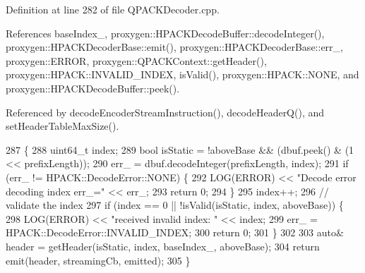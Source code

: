 Definition at line 282 of file Q\+P\+A\+C\+K\+Decoder.\+cpp.



References base\+Index\+\_\+, proxygen\+::\+H\+P\+A\+C\+K\+Decode\+Buffer\+::decode\+Integer(), proxygen\+::\+H\+P\+A\+C\+K\+Decoder\+Base\+::emit(), proxygen\+::\+H\+P\+A\+C\+K\+Decoder\+Base\+::err\+\_\+, proxygen\+::\+E\+R\+R\+OR, proxygen\+::\+Q\+P\+A\+C\+K\+Context\+::get\+Header(), proxygen\+::\+H\+P\+A\+C\+K\+::\+I\+N\+V\+A\+L\+I\+D\+\_\+\+I\+N\+D\+EX, is\+Valid(), proxygen\+::\+H\+P\+A\+C\+K\+::\+N\+O\+NE, and proxygen\+::\+H\+P\+A\+C\+K\+Decode\+Buffer\+::peek().



Referenced by decode\+Encoder\+Stream\+Instruction(), decode\+Header\+Q(), and set\+Header\+Table\+Max\+Size().


\begin{DoxyCode}
287                         \{
288   uint64\_t index;
289   \textcolor{keywordtype}{bool} isStatic = !aboveBase && (dbuf.peek() & (1 << prefixLength));
290   err_ = dbuf.decodeInteger(prefixLength, index);
291   \textcolor{keywordflow}{if} (err_ != HPACK::DecodeError::NONE) \{
292     LOG(ERROR) << \textcolor{stringliteral}{"Decode error decoding index err\_="} << err_;
293     \textcolor{keywordflow}{return} 0;
294   \}
295   index++;
296   \textcolor{comment}{// validate the index}
297   \textcolor{keywordflow}{if} (index == 0 || !isValid(isStatic, index, aboveBase)) \{
298     LOG(ERROR) << \textcolor{stringliteral}{"received invalid index: "} << index;
299     err_ = HPACK::DecodeError::INVALID_INDEX;
300     \textcolor{keywordflow}{return} 0;
301   \}
302 
303   \textcolor{keyword}{auto}& header = getHeader(isStatic, index, baseIndex_, aboveBase);
304   \textcolor{keywordflow}{return} emit(header, streamingCb, emitted);
305 \}
\end{DoxyCode}
